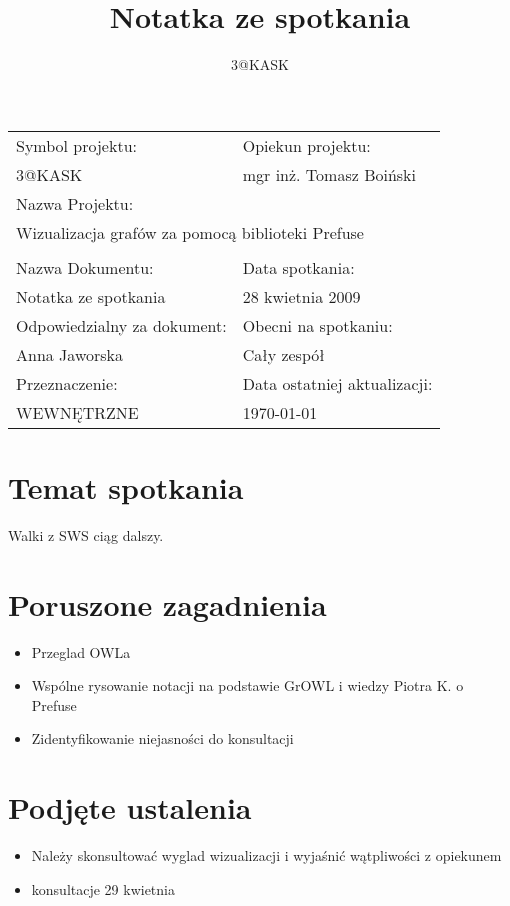 \documentclass[a4paper,10pt]{article}
\title{Notatka ze spotkania}
\author{3@KASK}
\begin{document}



\maketitle


\begin{center}
\begin{tabular}{|p{7cm}|p{7cm}|}
\hline
Symbol projektu: & Opiekun projektu:   \tabularnewline 
3@KASK & mgr inż. Tomasz Boiński    \tabularnewline \hline
\multicolumn{2}{|l|}{Nazwa Projektu: } \tabularnewline
\multicolumn{2}{|l|}{Wizualizacja grafów za pomocą biblioteki Prefuse } \tabularnewline 
\hline
\multicolumn{2}{l}{ } \tabularnewline %
\hline
Nazwa Dokumentu: & Data spotkania:   \tabularnewline 
Notatka ze spotkania & 28 kwietnia 2009 \tabularnewline \hline
Odpowiedzialny za dokument: & Obecni na spotkaniu:   \tabularnewline 
Anna Jaworska & Cały zespół \tabularnewline \hline
Przeznaczenie: & Data ostatniej aktualizacji:   \tabularnewline 
WEWNĘTRZNE & \today \tabularnewline \hline
\end{tabular}
\end{center}



\section{Temat spotkania}
Walki z SWS ciąg dalszy.

\section{Poruszone zagadnienia}
\begin{itemize}
 \item Przeglad OWLa 
\item  Wspólne rysowanie notacji na podstawie GrOWL i wiedzy Piotra K. o Prefuse 
\item  Zidentyfikowanie niejasności do konsultacji

\end{itemize}



\section{Podjęte ustalenia}
\begin{itemize}
 \item Należy skonsultować wyglad wizualizacji i wyjaśnić wątpliwości z opiekunem
 \item konsultacje 29 kwietnia
\end{itemize}
\end{document}
